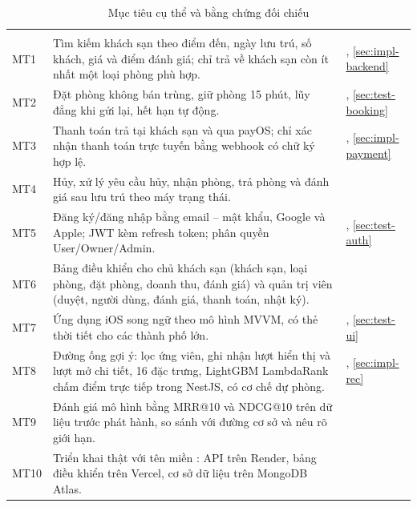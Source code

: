 \begin{rtable}
\begin{longtable}{|C{1.2cm}|L{8.4cm}|L{5.2cm}|}
\caption{Mục tiêu cụ thể và bằng chứng đối chiếu}\label{tab:objectives}\\
\hline
{} &  &  \\ \hline
\endfirsthead
\hline
{} &  &  \\ \hline
\endhead
MT1 & Tìm kiếm khách sạn theo điểm đến, ngày lưu trú, số khách, giá và điểm đánh giá; chỉ trả về khách sạn còn ít nhất một loại phòng phù hợp. & , \cref{sec:impl-backend} \\ \hline
MT2 & Đặt phòng không bán trùng, giữ phòng 15 phút, lũy đẳng khi gửi lại, hết hạn tự động. & , \cref{sec:test-booking} \\ \hline
MT3 & Thanh toán trả tại khách sạn và qua payOS; chỉ xác nhận thanh toán trực tuyến bằng webhook có chữ ký hợp lệ. & , \cref{sec:impl-payment} \\ \hline
MT4 & Hủy, xử lý yêu cầu hủy, nhận phòng, trả phòng và đánh giá sau lưu trú theo máy trạng thái. &  \\ \hline
MT5 & Đăng ký/đăng nhập bằng email -- mật khẩu, Google và Apple; JWT kèm refresh token; phân quyền User/Owner/Admin. & , \cref{sec:test-auth} \\ \hline
MT6 & Bảng điều khiển cho chủ khách sạn (khách sạn, loại phòng, đặt phòng, doanh thu, đánh giá) và quản trị viên (duyệt, người dùng, đánh giá, thanh toán, nhật ký). &  \\ \hline
MT7 & Ứng dụng iOS song ngữ theo mô hình MVVM, có thẻ thời tiết cho các thành phố lớn. & , \cref{sec:test-ui} \\ \hline
MT8 & Đường ống gợi ý: lọc ứng viên, ghi nhận lượt hiển thị và lượt mở chi tiết, 16 đặc trưng, LightGBM LambdaRank chấm điểm trực tiếp trong NestJS, có cơ chế dự phòng. & , \cref{sec:impl-rec} \\ \hline
MT9 & Đánh giá mô hình bằng MRR@10 và NDCG@10 trên dữ liệu trước phát hành, so sánh với đường cơ sở và nêu rõ giới hạn. &  \\ \hline
MT10 & Triển khai thật với tên miền : API trên Render, bảng điều khiển trên Vercel, cơ sở dữ liệu trên MongoDB Atlas. &  \\ \hline
\end{longtable}
\end{rtable}

